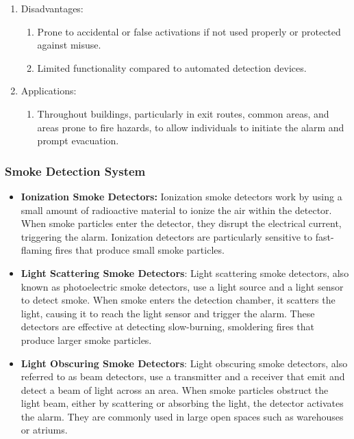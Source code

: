 \documentclass{article}
\begin{document}
\begin{enumerate}
\begin{enumerate}
    \item Disadvantages:
    \begin{enumerate}
      \item Prone to accidental or false activations if not used properly or protected against misuse.
      \item Limited functionality compared to automated detection devices.
    \end{enumerate}

    
    
    \item Applications:
    \begin{enumerate}
      \item Throughout buildings, particularly in exit routes, common areas, and areas prone to fire hazards, to allow individuals to initiate the alarm and prompt evacuation. 
    \end{enumerate}
  \end{enumerate}


\end{enumerate}

\subsubsection*{Smoke Detection System}
\begin{itemize}
  \item \textbf{Ionization Smoke Detectors:} Ionization smoke detectors work by using a small amount of radioactive material to ionize the air within the detector. When smoke particles enter the detector, they disrupt the electrical current, triggering the alarm. Ionization detectors are particularly sensitive to fast-flaming fires that produce small smoke particles.

  \item \textbf{Light Scattering Smoke Detectors}: Light scattering smoke detectors, also known as photoelectric smoke detectors, use a light source and a light sensor to detect smoke. When smoke enters the detection chamber, it scatters the light, causing it to reach the light sensor and trigger the alarm. These detectors are effective at detecting slow-burning, smoldering fires that produce larger smoke particles.
  
  \item \textbf{Light Obscuring Smoke Detectors}: Light obscuring smoke detectors, also referred to as beam detectors, use a transmitter and a receiver that emit and detect a beam of light across an area. When smoke particles obstruct the light beam, either by scattering or absorbing the light, the detector activates the alarm. They are commonly used in large open spaces such as warehouses or atriums.
\end{itemize}
\end{document}
